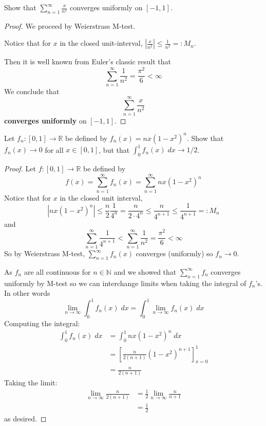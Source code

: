 \begin{prob}
    Show that $\sum_{n=1}^{\infty}\frac{x}{n^2}$ converges uniformly 
    on $[-1,1]$. 
\end{prob}
\begin{proof}
    We proceed by Weierstrass M-test. 

    Notice that for $x$ in the closed unit-interval, 
    $|\frac{x}{n^2}| \leq \frac{1}{n^2} =: M_n$. 

    Then it is well known from Euler's classic result that 
    \[
        \displaystyle\sum_{n=1}^{\infty}\frac{1}{n^2} = 
        \frac{\pi^2}{6} < \infty
    \]
    We conclude that 
    \[
        \displaystyle\sum_{n=1}^{\infty}\frac{x}{n^2}  
    \]
    \textbf{converges uniformly} on $[-1,1]$. 
\end{proof}
\begin{prob}
    Let $f_n : [0,1]\to \mathbb R$ be defined by 
    $f_n(x) = nx(1-x^2)^n$. Show that $f_n(x) \to 0$ for all 
    $x \in [0,1]$, but that $\int_0^1 f_n(x) \; dx \to 1/2$. 
\end{prob}
\begin{proof}
    Let $f : [0,1] \to \mathbb R$ be defined by 
    \[
        f(x) = \displaystyle\sum_{n=1}^{\infty} f_n(x)
        = 
        \displaystyle\sum_{n=1}^{\infty} nx(1-x^2)^n
    \]
    Notice that for $x$ in the closed unit interval, 
    \[
        |nx(1-x^2)^n| \leq \frac{n}{2}\frac{1}{4^n} = 
        \frac{n}{2 \cdot 4^n} \leq \frac{n}{4^{n+1}} \leq 
        \frac{1}{4^{n+1}} =: M_n
    \]
    and 
    \[
        \displaystyle\sum_{n=1}^\infty \frac{1}{4^{n+1}} 
        < \displaystyle\sum_{n=1}^\infty \frac{1}{n^2} 
        = \frac{\pi^2}{6} < \infty
    \]
    So by Weierstrass M-test, $\sum_{n=1}^{\infty}f_n(x)$ converges 
    (uniformly) so $f_n \to 0$.

    As $f_n$ are all continuous for $n \in \mathbb N$ and we showed 
    that $\sum_{n=1}^{\infty}f_n$ converges uniformly by M-test so 
    we can interchange limits when taking the integral of $f_n$'s. 
    In other words 
    \[
        \lim_{n\to\infty}\displaystyle\int_{0}^{1}f_n(x) \;dx = 
        \displaystyle\int_{0}^{1} \lim_{n\to\infty} f_n(x) \; dx
    \]
    Computing the integral: 
    \begin{align*}
        \displaystyle\int_0^1 f_n(x) \; dx 
        &= \displaystyle\int_0^1 nx(1-x^2)^n \; dx \\ 
        &= \left[\frac{n}{2(n+1)}(1-x^2)^{n+1} \right]_{x=0}^1 \\ 
        &= \frac{n}{2(n+1)}
    \end{align*}
    Taking the limit: 
    \begin{align*}
        \lim_{n\to\infty} \frac{n}{2(n+1)} 
        &= \frac{1}{2} \lim_{n\to\infty} \frac{n}{n+1} \\ 
        &= \frac{1}{2}
    \end{align*}
    as desired. 
\end{proof}

